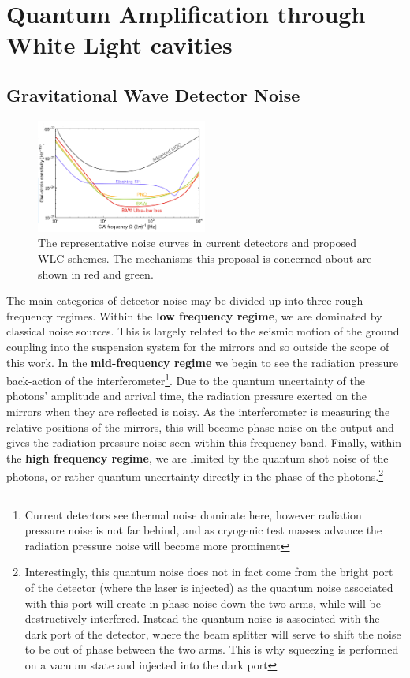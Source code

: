 \documentclass[aps,  
                a4paper, 
                amsmath, 
                amssymb, 
                preprint,
                tightenlines,  
                amsfonts,
                nofootinbib,
                onecolumn,
                titlepage,
                10pt
            ]{revtex4-2}
\begin{document}
\section{Quantum Amplification through White Light cavities}
    \subsection{Gravitational Wave Detector Noise}
    \label{sec:gwd-noise}
    \begin{figure}
        \centering
        \includegraphics[width=0.5\textwidth]{img/noise.png}
        \caption{The representative noise curves in current detectors and proposed WLC schemes. The mechanisms this proposal is concerned about are shown in red and green\cite{page2021}.}
        \label{fig:noise}
    \end{figure}
    The main categories of detector noise may be divided up into three rough frequency regimes. Within the \textbf{low frequency regime}, we are dominated by classical noise sources. This is largely related to the seismic motion of the ground coupling into the suspension system for the mirrors and so outside the scope of this work. In the \textbf{mid-frequency regime} we begin to see the radiation pressure back-action of the interferometer\footnote{Current detectors see thermal noise dominate here, however radiation pressure noise is not far behind, and as cryogenic test masses advance the radiation pressure noise will become more prominent}. Due to the quantum uncertainty of the photons' amplitude and arrival time, the radiation pressure exerted on the mirrors when they are reflected is noisy. As the interferometer is measuring the relative positions of the mirrors, this will become phase noise on the output and gives the radiation pressure noise seen within this frequency band. Finally, within the \textbf{high frequency regime}, we are limited by the quantum shot noise of the photons, or rather quantum uncertainty directly in the phase of the 
    photons.\footnote{Interestingly, this quantum noise does not in fact come from the bright port of the detector (where the laser is injected) as the quantum noise associated with this port will create in-phase noise down the two arms, while will be destructively interfered. Instead the quantum noise is associated with the dark port of the detector, where the beam splitter will serve to shift the noise to be out of phase between the two arms. This is why squeezing is performed on a vacuum state and injected into the dark port}
\end{document}
